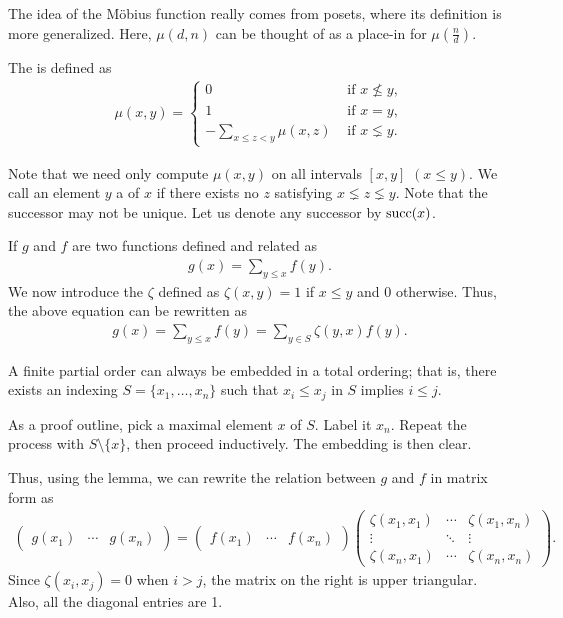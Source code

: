 The idea of the M\"obius function really comes from posets, where its definition is more generalized. Here, $\mu(d,n)$ can be thought of as a place-in for $\mu \left( \frac{n}{d} \right)$.

\begin{definition}
    The  is defined as
    \begin{align}
        \mu(x,y) = \begin{cases}
            0 &\text{ if } x \nleq y,\\
            1 &\text{ if } x = y,\\
            -\sum_{x \leq z < y} \mu(x,z) &\text{ if } x \lneq y.
        \end{cases}
    \end{align}
\end{definition}

Note that we need only compute $\mu(x,y)$ on all intervals $[x,y]$ $(x \leq y)$. We call an element $y$ a  of $x$ if there exists no $z$ satisfying $x \lneq z \lneq y$. Note that the successor may not be unique. Let us denote any successor by $\operatorname{succ}(x)$.

If $g$ and $f$ are two functions defined and related as
\begin{align}
    g(x) = \sum_{y \leq x} f(y).
\end{align}
We now introduce the  $\zeta$ defined as $\zeta(x,y) = 1$ if $x \leq y$ and $0$ otherwise. Thus, the above equation can be rewritten as
\begin{align}
    g(x) = \sum_{y \leq x} f(y) = \sum_{y \in S} \zeta(y,x) f(y). 
\end{align}

\begin{lemma}
    A finite partial order can always be embedded in a total ordering; that is, there exists an indexing $S = \{x_{1},\ldots,x_{n}\}$ such that $x_{i} \leq x_{j}$ in $S$ implies $i \leq j$.
\end{lemma}

As a proof outline, pick a maximal element $x$ of $S$. Label it $x_{n}$. Repeat the process with $S\setminus\{x\}$, then proceed inductively. The embedding is then clear.

Thus, using the lemma, we can rewrite the relation between $g$ and $f$ in matrix form as
\begin{align}
    \begin{pmatrix}
        g(x_{1}) & \cdots & g(x_{n})
    \end{pmatrix} = \begin{pmatrix}
        f(x_{1}) & \cdots & f(x_{n})
    \end{pmatrix} \begin{pmatrix}
        \zeta(x_{1},x_{1}) & \cdots & \zeta(x_{1},x_{n}) \\
        \vdots & \ddots & \vdots \\
        \zeta(x_{n},x_{1}) & \cdots & \zeta(x_{n},x_{n})
    \end{pmatrix}.
\end{align}
Since $\zeta(x_{i},x_{j}) = 0$ when $i > j$, the matrix on the right is upper triangular. Also, all the diagonal entries are 1.